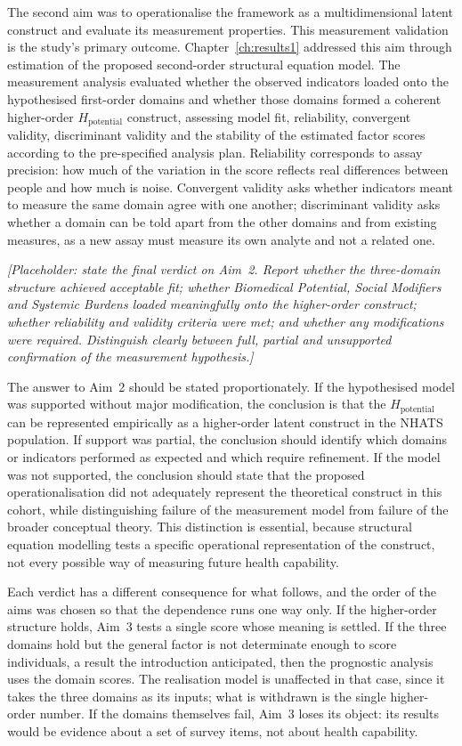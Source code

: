 The second aim was to operationalise the framework as a multidimensional latent construct and evaluate its measurement properties. This measurement validation is the study's primary outcome. Chapter~\ref{ch:results1} addressed this aim through estimation of the proposed second-order structural equation model. The measurement analysis evaluated whether the observed indicators loaded onto the hypothesised first-order domains and whether those domains formed a coherent higher-order $H_{\text{potential}}$ construct, assessing model fit, reliability, convergent validity, discriminant validity and the stability of the estimated factor scores according to the pre-specified analysis plan. Reliability corresponds to assay precision: how much of the variation in the score reflects real differences between people and how much is noise. Convergent validity asks whether indicators meant to measure the same domain agree with one another; discriminant validity asks whether a domain can be told apart from the other domains and from existing measures, as a new assay must measure its own analyte and not a related one.

\medskip
\noindent\emph{[Placeholder: state the final verdict on Aim~2. Report whether the three-domain structure achieved acceptable fit; whether Biomedical Potential, Social Modifiers and Systemic Burdens loaded meaningfully onto the higher-order construct; whether reliability and validity criteria were met; and whether any modifications were required. Distinguish clearly between full, partial and unsupported confirmation of the measurement hypothesis.]}

The answer to Aim~2 should be stated proportionately. If the hypothesised model was supported without major modification, the conclusion is that the $H_{\text{potential}}$ can be represented empirically as a higher-order latent construct in the NHATS population. If support was partial, the conclusion should identify which domains or indicators performed as expected and which require refinement. If the model was not supported, the conclusion should state that the proposed operationalisation did not adequately represent the theoretical construct in this cohort, while distinguishing failure of the measurement model from failure of the broader conceptual theory. This distinction is essential, because structural equation modelling tests a specific operational representation of the construct, not every possible way of measuring future health capability.

Each verdict has a different consequence for what follows, and the order of the
aims was chosen so that the dependence runs one way only. If the higher-order
structure holds, Aim~3 tests a single score whose meaning is settled. If the
three domains hold but the general factor is not determinate enough to score
individuals, a result the introduction anticipated, then the prognostic analysis
uses the domain scores. The realisation model is unaffected in that case, since
it takes the three domains as its inputs; what is withdrawn is the single
higher-order number. If the domains themselves fail, Aim~3 loses its object: its
results would be evidence about a set of survey items, not about health
capability.

